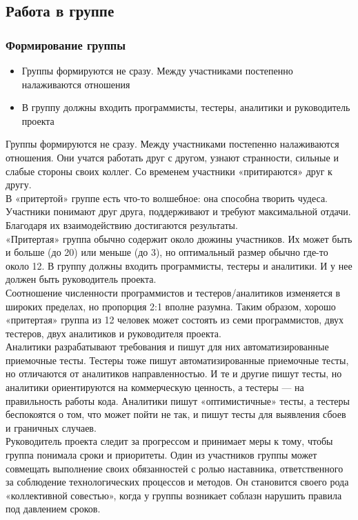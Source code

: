 \documentclass{../industrial-development}
\begin{document}
\subsection{Работа в группе}
\begin{frame} \frametitle{Формирование группы}
\begin{itemize}
  \item Группы формируются не сразу. Между участниками постепенно налаживаются отношения
  \item В группу должны входить программисты, тестеры, аналитики и руководитель проекта
\end{itemize}
\end{frame}
\lecturenotes
Группы формируются не сразу. Между участниками постепенно налаживаются отношения. Они учатся работать друг с другом, узнают странности, сильные и слабые стороны своих коллег. Со временем
участники «притираются» друг к другу.\\
В «притертой» группе есть что-то волшебное: она способна творить чудеса. Участники понимают друг друга, поддерживают и требуют максимальной отдачи. Благодаря их взаимодействию достигаются результаты.\\
«Притертая» группа обычно содержит около дюжины участников. Их может быть и больше (до 20) или меньше (до 3), но оптимальный размер обычно где-то около 12. В группу должны входить программисты, тестеры и аналитики. И у нее должен быть руководитель проекта.\\
Соотношение численности программистов и тестеров/аналитиков изменяется в широких пределах, но пропорция 2:1 вполне разумна. Таким образом, хорошо «притертая» группа из 12 человек может состоять из семи программистов, двух тестеров, двух аналитиков и руководителя проекта.\\
Аналитики разрабатывают требования и пишут для них автоматизированные приемочные тесты. Тестеры тоже пишут автоматизированные приемочные тесты, но отличаются от аналитиков направленностью. И те и другие пишут тесты, но аналитики ориентируются на коммерческую ценность, а тестеры — на правильность работы кода. Аналитики пишут «оптимистичные» тесты, а тестеры беспокоятся о том, что
может пойти не так, и пишут тесты для выявления сбоев и граничных случаев.\\
Руководитель проекта следит за прогрессом и принимает меры к тому, чтобы группа понимала сроки и приоритеты. Один из участников группы может совмещать выполнение своих обязанностей с ролью наставника, ответственного за соблюдение технологических процессов и методов. Он становится своего рода «коллективной совестью», когда у группы возникает соблазн нарушить правила под давлением сроков.\\
\end{document}
